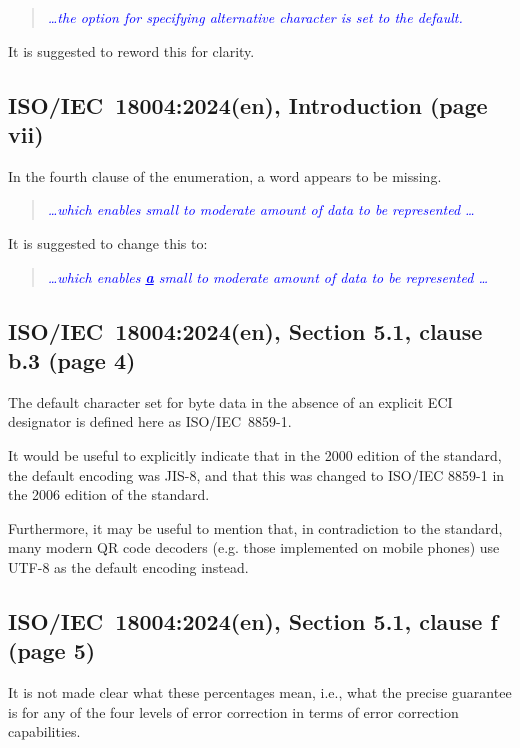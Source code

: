 \documentclass[a4paper,twoside]{article}
\newcommand{\shortstandard}{ISO/IEC~18004}
\newcommand{\standard}{\shortstandard:2024(en)}
\newcommand{\quotestandard}[1]{\textcolor{blue}{\textit{#1}}}
\newcommand{\ddd}{\dots}
\newcommand{\change}[1]{\underline{\textbf{#1}}}
\begin{document}
\begin{quote}
\quotestandard{\ddd the option for specifying alternative character is set to the default.}
\end{quote}

It is suggested to reword this for clarity.

\subsection{\standard, Introduction (page vii)}

In the fourth clause of the enumeration, a word appears to be missing.

\begin{quote}
\quotestandard{\ddd which enables small to moderate amount of data to be represented \ddd}
\end{quote}

It is suggested to change this to:

\begin{quote}
\quotestandard{\ddd which enables \change{a} small to moderate amount of data to be represented \ddd}
\end{quote}

\subsection{\standard, Section 5.1, clause b.3 (page 4)}

The default character set for byte data in the absence of an explicit ECI designator is defined here as ISO/IEC~8859-1.

It would be useful to explicitly indicate that in the 2000 edition of the standard, the default encoding was JIS-8,
and that this was changed to ISO/IEC 8859-1 in the 2006 edition of the standard.

Furthermore, it may be useful to mention that, in contradiction to the standard, many modern QR code decoders (e.g. those
implemented on mobile phones) use UTF-8 as the default encoding instead.

\subsection{\standard, Section 5.1, clause f (page 5)}

It is not made clear what these percentages mean, i.e., what the precise guarantee is for any of the four levels of
error correction in terms of error correction capabilities.
\end{document}
